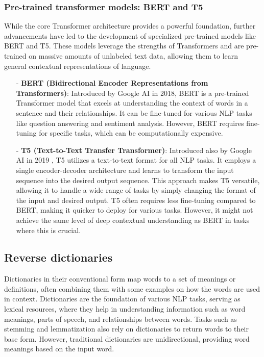 \documentclass[12.5pt]{article}
\begin{document}
\subsubsection{Pre-trained transformer models: BERT and T5}

While the core Transformer architecture provides a powerful foundation, further advancements have led to the development of specialized pre-trained models like BERT and T5. These models leverage the strengths of Transformers and are pre-trained on massive amounts of unlabeled text data, allowing them to learn general contextual representations of language.

\begin{enumerate}
    \item[-] \textbf{BERT (Bidirectional Encoder Representations from Transformers)}: Introduced by Google AI \cite{devlin2018} in 2018, BERT is a pre-trained Transformer model that excels at understanding the context of words in a sentence and their relationships. It can be fine-tuned for various NLP tasks like question answering and sentiment analysis. However, BERT requires fine-tuning for specific tasks, which can be computationally expensive.
    \item[-] \textbf{T5 (Text-to-Text Transfer Transformer)}: Introduced also by Google AI in 2019 \cite{Raffel2019}, T5 utilizes a text-to-text format for all NLP tasks. It employs a single encoder-decoder architecture and learns to transform the input sequence into the desired output sequence. This approach makes T5 versatile, allowing it to handle a wide range of tasks by simply changing the format of the input and desired output. T5 often requires less fine-tuning compared to BERT, making it quicker to deploy for various tasks. However, it might not achieve the same level of deep contextual understanding as BERT in tasks where this is crucial.
\end{enumerate}

\subsection{Reverse dictionaries}

Dictionaries in their conventional form map words to a set of meanings or definitions, often combining them with some examples on how the words are used in context. Dictionaries are the foundation of various NLP tasks, serving as lexical resources, where they help in understanding information such as word meanings, parts of speech, and relationships between words. Tasks such as stemming and lemmatization also rely on dictionaries to return words to their base form. However, traditional dictionaries are unidirectional, providing word meanings based on the input word.
\end{document}
